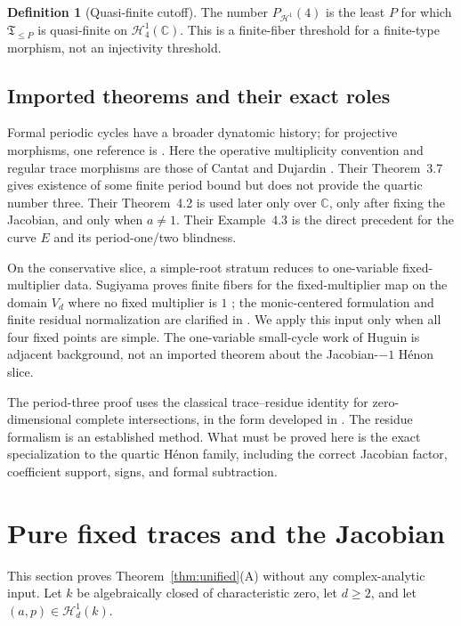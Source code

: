 \documentclass[11pt]{article}
\theoremstyle{definition}
\newtheorem{definition}[theorem]{Definition}
\newcommand{\C}{\mathbb C}
\newcommand{\Hn}{\mathcal H}
\begin{document}
\begin{definition}[Quasi-finite cutoff]
\label{def:cutoff}
The number $P_{\Hn^1}(4)$ is the least $P$ for which $\mathfrak T_{\le P}$ is quasi-finite on $\Hn^1_4(\C)$. This is a finite-fiber threshold for a finite-type morphism, not an injectivity threshold.
\end{definition}

\subsection{Imported theorems and their exact roles}

Formal periodic cycles have a broader dynatomic history; for projective morphisms, one reference is \cite{Hutz2010}. Here the operative multiplicity convention and regular trace morphisms are those of Cantat and Dujardin \cite{CantatDujardin2026}. Their Theorem~3.7 gives existence of some finite period bound but does not provide the quartic number three. Their Theorem~4.2 is used later only over $\C$, only after fixing the Jacobian, and only when $a\ne1$. Their Example~4.3 is the direct precedent for the curve $E$ and its period-one/two blindness.

On the conservative slice, a simple-root stratum reduces to one-variable fixed-multiplier data. Sugiyama proves finite fibers for the fixed-multiplier map on the domain $V_d$ where no fixed multiplier is $1$ \cite{Sugiyama2017}; the monic-centered formulation and finite residual normalization are clarified in \cite{Sugiyama2023}. We apply this input only when all four fixed points are simple. The one-variable small-cycle work of Huguin \cite{Huguin2024} is adjacent background, not an imported theorem about the Jacobian-$-1$ H\'enon slice.

The period-three proof uses the classical trace--residue identity for zero-dimensional complete intersections, in the form developed in \cite{CattaniDickensteinSturmfels1996}. The residue formalism is an established method. What must be proved here is the exact specialization to the quartic H\'enon family, including the correct Jacobian factor, coefficient support, signs, and formal subtraction.

\section{Pure fixed traces and the Jacobian}
\label{sec:jacobian}

This section proves Theorem~\ref{thm:unified}\textnormal{(A)} without any complex-analytic input. Let $k$ be algebraically closed of characteristic zero, let $d\ge2$, and let $(a,p)\in\Hn^1_d(k)$.
\end{document}
